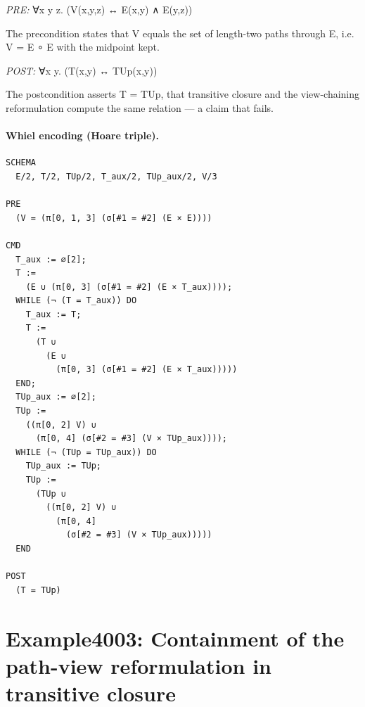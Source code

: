 \documentclass[10pt]{article}
\begin{document}
\textit{PRE:} ∀x y z. (V(x,y,z) ↔ E(x,y) ∧ E(y,z))\par The precondition states that V equals the set of length-two paths through E, i.e. V = E ∘ E with the midpoint kept.

\textit{POST:} ∀x y. (T(x,y) ↔ TUp(x,y))\par The postcondition asserts T = TUp, that transitive closure and the view-chaining reformulation compute the same relation --- a claim that fails.

\paragraph{Whiel encoding (Hoare triple).}

\begin{Verbatim}[fontsize=\scriptsize,breaklines=true,breakanywhere=true,frame=single,framesep=1.5mm]
SCHEMA
  E/2, T/2, TUp/2, T_aux/2, TUp_aux/2, V/3

PRE
  (V = (π[0, 1, 3] (σ[#1 = #2] (E × E))))

CMD
  T_aux := ∅[2];
  T :=
    (E ∪ (π[0, 3] (σ[#1 = #2] (E × T_aux))));
  WHILE (¬ (T = T_aux)) DO
    T_aux := T;
    T :=
      (T ∪
        (E ∪
          (π[0, 3] (σ[#1 = #2] (E × T_aux)))))
  END;
  TUp_aux := ∅[2];
  TUp :=
    ((π[0, 2] V) ∪
      (π[0, 4] (σ[#2 = #3] (V × TUp_aux))));
  WHILE (¬ (TUp = TUp_aux)) DO
    TUp_aux := TUp;
    TUp :=
      (TUp ∪
        ((π[0, 2] V) ∪
          (π[0, 4]
            (σ[#2 = #3] (V × TUp_aux)))))
  END

POST
  (T = TUp)
\end{Verbatim}

\Needspace{0.45\textheight}

\section{Example4003: Containment of the path-view reformulation in transitive closure}\label{case:Example4003}
\end{document}
